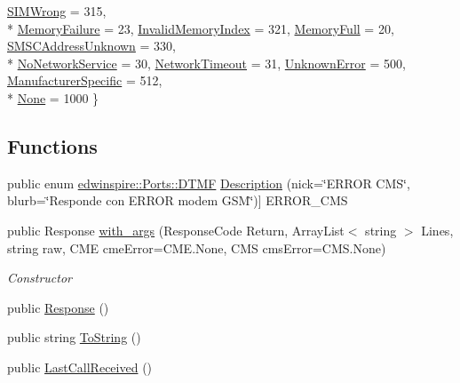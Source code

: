 \begin{DoxyCompactItemize}
\hyperlink{namespaceedwinspire_1_1_ports_aa6e4441b65db895e600a13038b3d5ff4a64f7f9a49642e1f8a9752f009597e31b}{S\-I\-M\-Wrong} =  315, 
\\*
\hyperlink{namespaceedwinspire_1_1_ports_aa6e4441b65db895e600a13038b3d5ff4a2a58ed09b8a8239b15d3a0e0c365c029}{Memory\-Failure} =  23, 
\hyperlink{namespaceedwinspire_1_1_ports_aa6e4441b65db895e600a13038b3d5ff4a7f7b32d7fcf2c3be5c1ad4d9672d7f4e}{Invalid\-Memory\-Index} =  321, 
\hyperlink{namespaceedwinspire_1_1_ports_aa6e4441b65db895e600a13038b3d5ff4a9c4b821e98068d17ab433a2059b86e65}{Memory\-Full} =  20, 
\hyperlink{namespaceedwinspire_1_1_ports_aa6e4441b65db895e600a13038b3d5ff4a96b5eb25edeea51f80555bfc41c1c14b}{S\-M\-S\-C\-Address\-Unknown} =  330, 
\\*
\hyperlink{namespaceedwinspire_1_1_ports_aa6e4441b65db895e600a13038b3d5ff4a941770a50c4e4f7a763fe278de42596a}{No\-Network\-Service} =  30, 
\hyperlink{namespaceedwinspire_1_1_ports_aa6e4441b65db895e600a13038b3d5ff4a4ab8d67ce74f17111c2c63028b724909}{Network\-Timeout} =  31, 
\hyperlink{namespaceedwinspire_1_1_ports_aa6e4441b65db895e600a13038b3d5ff4a36b13bee92e122caddcb8abefb6eec31}{Unknown\-Error} =  500, 
\hyperlink{namespaceedwinspire_1_1_ports_aa6e4441b65db895e600a13038b3d5ff4a948beca328fd2b2bc9dbd6137579e248}{Manufacturer\-Specific} =  512, 
\\*
\hyperlink{namespaceedwinspire_1_1_ports_aa6e4441b65db895e600a13038b3d5ff4ac7485dcc8d256a6f197ed7802687f252}{None} =  1000
 \}
\end{DoxyCompactItemize}
\subsection*{Functions}
\begin{DoxyCompactItemize}
\item 
public enum \hyperlink{namespaceedwinspire_1_1_ports_af4e0ec730b70610713b98825eb7c6f53}{edwinspire\-::\-Ports\-::\-D\-T\-M\-F} \hyperlink{namespaceedwinspire_1_1_ports_aca82b59bbf3249fe74227599ba5a813b}{Description} (nick=\char`\"{}E\-R\-R\-O\-R C\-M\-S\char`\"{}, blurb=\char`\"{}Responde con E\-R\-R\-O\-R modem G\-S\-M\char`\"{})\mbox{]} E\-R\-R\-O\-R\-\_\-\-C\-M\-S
\item 
public Response \hyperlink{namespaceedwinspire_1_1_ports_a6ef86265a936a529ea91a077ab2f2ca3}{with\-\_\-args} (Response\-Code Return, Array\-List$<$ string $>$ Lines, string raw, C\-M\-E cme\-Error=C\-M\-E.\-None, C\-M\-S cms\-Error=C\-M\-S.\-None)
\begin{DoxyCompactList}\small\item\em Constructor \end{DoxyCompactList}\item 
public \hyperlink{namespaceedwinspire_1_1_ports_afc37e1ee0b1084b5c5fccf2fab440b4f}{Response} ()
\item 
public string \hyperlink{namespaceedwinspire_1_1_ports_a1d54df4f08e40e31578925d13f6ee9c6}{To\-String} ()
\item 
public \hyperlink{namespaceedwinspire_1_1_ports_a1cb04d0401c5f2277711b286f3199061}{Last\-Call\-Received} ()
\end{DoxyCompactItemize}
